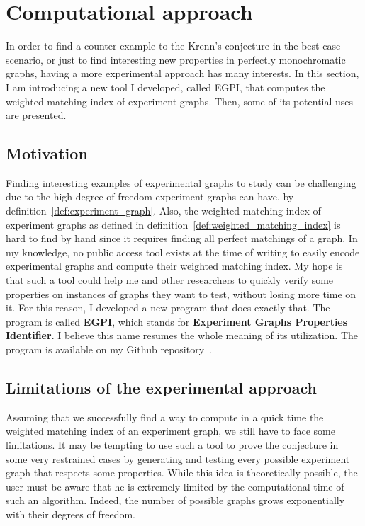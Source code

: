 \chapter{Computational approach}
\label{ch:computational-approach}

In order to find a counter-example to the Krenn's conjecture in the best case scenario, or just to find interesting new properties in perfectly monochromatic graphs, having a more experimental approach has many interests.
In this section, I am introducing a new tool I developed, called EGPI, that computes the weighted matching index of experiment graphs.
Then, some of its potential uses are presented.

\section{Motivation}
\label{sec:computational-motivations}

Finding interesting examples of experimental graphs to study can be challenging due to the high degree of freedom experiment graphs can have, by definition~\ref{def:experiment_graph}.
Also, the weighted matching index of experiment graphs as defined in definition~\ref{def:weighted_matching_index} is hard to find by hand since it requires finding all perfect matchings of a graph.
In my knowledge, no public access tool exists at the time of writing to easily encode experimental graphs and compute their weighted matching index.
My hope is that such a tool could help me and other researchers to quickly verify some properties on instances of graphs they want to test, without losing more time on it.
For this reason, I developed a new program that does exactly that.
The program is called \textbf{EGPI}, which stands for \textbf{Experiment Graphs Properties Identifier}.
I believe this name resumes the whole meaning of its utilization.
The program is available on my Github repository~\cite{githubEGPI}.


\section{Limitations of the experimental approach}
\label{sec:egpi-limitations}

Assuming that we successfully find a way to compute in a quick time the weighted matching index of an experiment graph, we still have to face some limitations.
It may be tempting to use such a tool to prove the conjecture in some very restrained cases by generating and testing every possible experiment graph that respects some properties.
While this idea is theoretically possible, the user must be aware that he is extremely limited by the computational time of such an algorithm.
Indeed, the number of possible graphs grows exponentially with their degrees of freedom.\\

